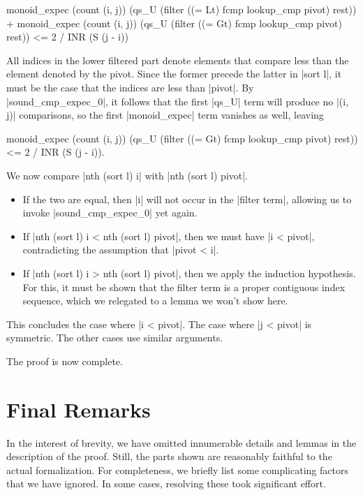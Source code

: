 \documentclass[runningheads]{llncs}
\begin{document}
\begin{code}
monoid_expec (count (i, j))
  (qs_U (filter ((= Lt) fcmp lookup_cmp pivot) rest)) +
monoid_expec (count (i, j))
  (qs_U (filter ((= Gt) fcmp lookup_cmp pivot) rest)) <= 2 / INR (S (j - i))
\end{code}
All indices in the lower filtered part denote elements that compare less than the element denoted by the pivot. Since the former precede the latter in |sort l|, it must be the case that the indices are less than |pivot|. By |sound_cmp_expec_0|, it follows that the first |qs_U| term will produce no |(i, j)| comparisons, so the first |monoid_expec| term vanishes as well, leaving
\begin{code}
monoid_expec (count (i, j))
  (qs_U (filter ((= Gt) fcmp lookup_cmp pivot) rest)) <= 2 / INR (S (j - i)).
\end{code}
We now compare |nth (sort l) i| with |nth (sort l) pivot|.
\begin{itemize}
\item If the two are equal, then |i| will not occur in the |filter term|, allowing us to invoke |sound_cmp_expec_0| yet again.
\item If |nth (sort l) i < nth (sort l) pivot|, then we must have |i < pivot|, contradicting the assumption that |pivot < i|.
\item If |nth (sort l) i > nth (sort l) pivot|, then we apply the induction hypothesis. For this, it must be shown that the filter term is a proper contiguous index sequence, which we relegated to a lemma we won't show here.
\end{itemize}
This concludes the case where |i < pivot|. The case where |j < pivot| is symmetric. The other cases use similar arguments.

The proof is now complete.

\section{Final Remarks}
\label{conclusion}

In the interest of brevity, we have omitted innumerable details and lemmas in the description of the proof. Still, the parts shown are reasonably faithful to the actual formalization. For completeness, we briefly list some complicating factors that we have ignored. In some cases, resolving these took significant effort.
\end{document}

